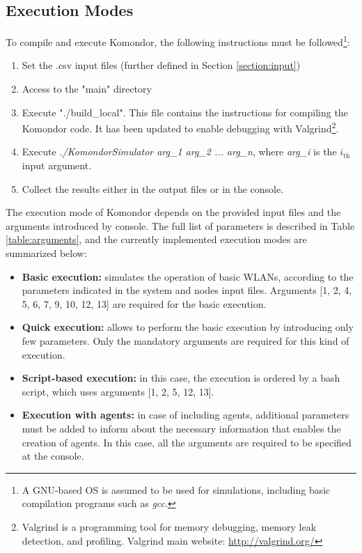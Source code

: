 \documentclass[a4paper]{article}
\begin{document}
\subsection{Execution Modes}
\label{section:execution_modes}
To compile and execute Komondor, the following instructions must be followed\footnote{A GNU-based OS is assumed to be used for simulations, including basic compilation programs such as \emph{gcc}.}:
\begin{enumerate}
	\item Set the .csv input files (further defined in Section \ref{section:input})
	\item Access to the "main" directory
	\item Execute "./build\_local". This file contains the instructions for compiling the Komondor code. It has been updated to enable debugging with Valgrind\footnote{Valgrind is a programming tool for memory debugging, memory leak detection, and profiling. Valgrind main website: \url{http://valgrind.org/}}.
	\item Execute \textit{./KomondorSimulator arg\_1 arg\_2 ... arg\_n}, where \textit{arg\_i} is the $i_{\text{th}}$ input argument.
	\item Collect the results either in the output files or in the console.
\end{enumerate}

The execution mode of Komondor depends on the provided input files and the arguments introduced by console. The full list of parameters is described in Table \ref{table:arguments}, and the currently implemented execution modes are summarized below:
\begin{itemize}
	\item \textbf{Basic execution:} simulates the operation of basic WLANs, according to the parameters indicated in the system and nodes input files. Arguments [1, 2, 4, 5, 6, 7, 9, 10, 12, 13] are required for the basic execution.
	\item \textbf{Quick execution:} allows to perform the basic execution by introducing only few parameters. Only the mandatory arguments are required for this kind of execution.
	\item \textbf{Script-based execution:} in this case, the execution is ordered by a bash script, which uses arguments [1, 2, 5, 12, 13].
	\item \textbf{Execution with agents:} in case of including agents, additional parameters must be added to inform about the necessary information that enables the creation of agents. In this case, all the arguments are required to be specified at the console.
\end{itemize}
 
\end{document}
